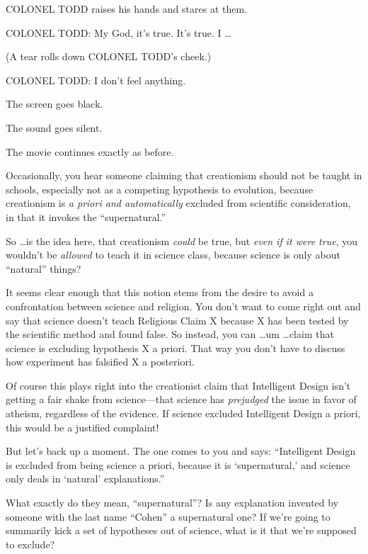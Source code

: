 {
 COLONEL TODD raises his hands and stares at them.}

{
 COLONEL TODD: My God, it's true.
It's true. I \ldots}

{
 (A tear rolls down COLONEL TODD's cheek.)}

{
 COLONEL TODD: I don't feel anything.}

{
 The screen goes black.}

{
 The sound goes silent.}

{
 The movie continues exactly as before.}

\myendsectiontext


{
 Occasionally, you hear someone claiming that creationism should
not be taught in schools, especially not as a competing hypothesis to
evolution, because creationism is \textit{a priori and automatically}
excluded from scientific consideration, in that it invokes the
``supernatural.'' }

{
 So \ldots is the idea here, that creationism \textit{could} be
true, but \textit{even if it were true}, you wouldn't
be \textit{allowed} to teach it in science class, because science is
only about ``natural'' things?}

{
 It seems clear enough that this notion stems from the desire to
avoid a confrontation between science and religion. You
don't want to come right out and say that science
doesn't teach Religious Claim X because X has been
tested by the scientific method and found false. So instead, you can
\ldots um \ldots claim that science is excluding hypothesis X a priori.
That way you don't have to discuss how experiment has
falsified X a posteriori.}

{
 Of course this plays right into the creationist claim that
Intelligent Design isn't getting a fair shake from
science---that science has \textit{prejudged} the issue in favor of
atheism, regardless of the evidence. If science excluded Intelligent
Design a priori, this would be a justified complaint!}

{
 But let's back up a moment. The one comes to you
and says: ``Intelligent Design is excluded from being
science a priori, because it is
`supernatural,' and science only deals
in `natural'
explanations.''}

{
 What exactly do they mean,
``supernatural''? Is any explanation
invented by someone with the last name
``Cohen'' a supernatural one? If
we're going to summarily kick a set of hypotheses out
of science, what is it that we're supposed to exclude?}

